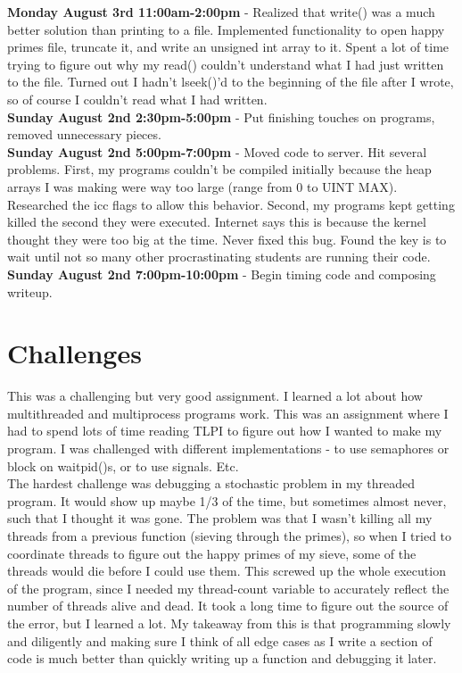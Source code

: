 \documentclass[11pt]{article}
\begin{document}
\textbf{Monday August 3rd 11:00am-2:00pm} - Realized that write() was a much better solution than printing to a file. Implemented functionality to open happy primes file, truncate it, and write an unsigned int array to it. Spent a lot of time trying to figure out why my read() couldn't understand what I had just written to the file. Turned out I hadn't lseek()'d to the beginning of the file after I wrote, so of course I couldn't read what I had written. \\
\textbf{Sunday August 2nd 2:30pm-5:00pm} - Put finishing touches on programs, removed unnecessary pieces. \\
\textbf{Sunday August 2nd 5:00pm-7:00pm} - Moved code to server. Hit several problems. First, my programs couldn't be compiled initially because the heap arrays I was making were way too large (range from 0 to UINT MAX). Researched the icc flags to allow this behavior. Second, my programs kept getting killed the second they were executed. Internet says this is because the kernel thought they were too big at the time. Never fixed this bug. Found the key is to wait until not so many other procrastinating students are running their code. \\
\textbf{Sunday August 2nd 7:00pm-10:00pm} - Begin timing code and composing writeup. \\



\section{Challenges}
This was a challenging but very good assignment. I learned a lot about how multithreaded and multiprocess programs work. This was an assignment where I had to spend lots of time reading TLPI to figure out how I wanted to make my program. I was challenged with different implementations - to use semaphores or block on waitpid()s, or to use signals. Etc. \\

The hardest challenge was debugging a stochastic problem in my threaded program. It would show up maybe 1/3 of the time, but sometimes almost never, such that I thought it was gone. The problem was that I wasn't killing all my threads from a previous function (sieving through the primes), so when I tried to coordinate threads to figure out the happy primes of my sieve, some of the threads would die before I could use them. This screwed up the whole execution of the program, since I needed my thread-count variable to accurately reflect the number of threads alive and dead. It took a long time to figure out the source of the error, but I learned a lot. My takeaway from this is that programming slowly and diligently and making sure I think of all edge cases as I write a section of code is much better than quickly writing up a function and debugging it later. \\
\end{document}
